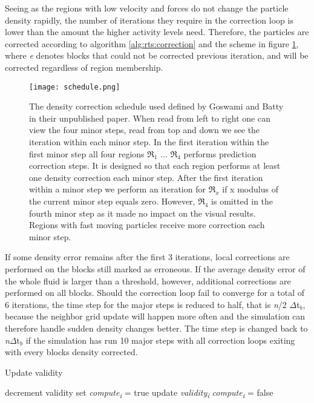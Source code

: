 \documentclass[../../main.tex]{subfiles}
\begin{document}
Seeing as the regions with low velocity and forces do not change the particle density rapidly, the number of iterations they require in the correction loop is lower than the amount the higher activity levels need. Therefore, the particles are corrected according to algorithm \ref{alg:rts:correction} and the scheme in figure \ref{fig:schedule}, where \textit{e} denotes blocks that could not be corrected previous iteration, and will be corrected regardless of region membership. 

\begin{figure}[h!]
    \centering
    \texttt{[image: schedule.png]}
    \caption[Correction scheme for RTS]{ The density correction schedule used defined by Goswami and Batty in their unpublished paper. When read from left to right one can view the four minor steps, read from top and down we see the iteration within each minor step. In the first iteration within the first minor step all four regions $\Re_1$ ... $\Re_4$ performs prediction correction steps. It is designed so that each region performs at least one density correction each minor step. After the first iteration within a minor step we perform an iteration for $\Re_x$ if x modulus of the current minor step equals zero. However, $\Re_4$ is omitted in the fourth minor step as it made no impact on the visual results. Regions with fast moving particles receive more correction each minor step. }
    \label{fig:schedule}
\end{figure}

If some density error remains after the first 3 iterations, local corrections are performed on the blocks still marked as erroneous. If the average density error of the whole fluid is larger than a threshold, however, additional corrections are performed on all blocks. Should the correction loop fail to converge for a total of 6 iterations, the time step for the major steps is reduced to half, that is \textit{n}/2 $\Delta$t$_b$, because the neighbor grid update will happen more often and the simulation can therefore handle sudden density changes better. The time step is changed back to \textit{n}$\Delta$t$_b$ if the simulation has run 10 major steps with all correction loops exiting with every blocks density corrected. 

 
\begin{algorithm}[h]
    \caption{Update validity}
    \label{alg:validity}
    \begin{algorithmic}[1]
            \State decrement validity
                \State set \textit{{\texorpdfstring{compute\textsubscript{i}}{compute i}}} = true
                \State update \textit{{\texorpdfstring{validity\textsubscript{i}}{validity i}}}
            \Else
                \State \textit{{\texorpdfstring{compute\textsubscript{i}}{compute i}}} = false
            \EndIf
        \EndFor
   \end{algorithmic}
\end{algorithm}
\end{document}
